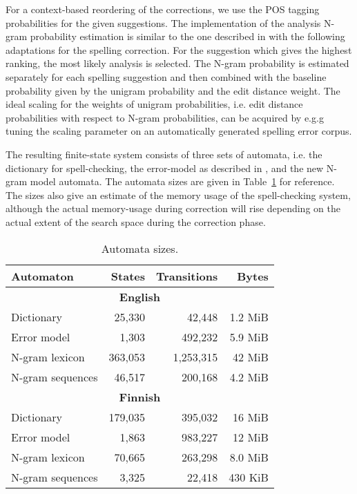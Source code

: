 \documentclass[postprint]{flammie}
\begin{document}
For a context-based reordering of the corrections, we use the POS tagging
probabilities for the given suggestions. The implementation of the analysis
N-gram probability estimation is similar to the one described in
\cite{silfverberg/2011} with the following adaptations for the spelling
correction. For the suggestion which gives the highest ranking, the most likely
analysis is selected.  The N-gram probability is estimated separately for each
spelling suggestion and then combined with the baseline probability given by
the unigram probability and the edit distance weight. The ideal scaling for the
weights of unigram probabilities, i.e.  edit distance probabilities with
respect to N-gram probabilities, can be acquired by e.g.g tuning the scaling
parameter on an automatically generated spelling error corpus.


The resulting finite-state system consists of three sets of automata, i.e. the
dictionary for spell-checking, the error-model as described in
\cite{pirinen/2010/lrec}, and the new N-gram model automata. The automata sizes
are given in Table~\ref{table:sizes} for reference. The sizes also give an
estimate of the memory usage of the spell-checking system, although the actual
memory-usage during correction will rise depending on the actual extent of the
search space during the correction phase.

\begin{table}
\caption{Automata sizes\label{table:sizes}.}
\begin{center}
\begin{tabular}{lrrr}
    Automaton & States & Transitions & Bytes \\
    \hline
    \multicolumn{4}{c}{\textbf{English}} \\
    \hline
    Dictionary & 25,330 & 42,448 & 1.2 MiB \\
    Error model & 1,303 & 492,232 & 5.9 MiB \\
    N-gram lexicon & 363,053 & 1,253,315 & 42 MiB \\
    N-gram sequences & 46,517 & 200,168 & 4.2 MiB \\
    \hline
    \multicolumn{4}{c}{\textbf{Finnish}} \\
    \hline
    Dictionary & 179,035 & 395,032 & 16 MiB \\
    Error model & 1,863 & 983,227 & 12 MiB \\
    N-gram lexicon & 70,665 & 263,298 & 8.0 MiB \\
    N-gram sequences & 3,325 & 22,418 & 430 KiB \\
    \hline
\end{tabular}
\end{center}
\end{table}
\end{document}
